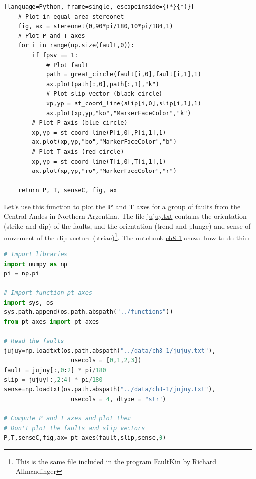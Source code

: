\documentclass[a4paper , 12pt]{book}
\begin{document}
\begin{center}
\begin{lstlisting}[language=Python, frame=single, escapeinside={(*}{*)}]
	# Plot in equal area stereonet
	fig, ax = stereonet(0,90*pi/180,10*pi/180,1)
	# Plot P and T axes
	for i in range(np.size(fault,0)):
		if fpsv == 1:
			# Plot fault
			path = great_circle(fault[i,0],fault[i,1],1)
			ax.plot(path[:,0],path[:,1],"k")
			# Plot slip vector (black circle)
			xp,yp = st_coord_line(slip[i,0],slip[i,1],1)
			ax.plot(xp,yp,"ko","MarkerFaceColor","k")
		# Plot P axis (blue circle)
		xp,yp = st_coord_line(P[i,0],P[i,1],1)
		ax.plot(xp,yp,"bo","MarkerFaceColor","b")
		# Plot T axis (red circle)
		xp,yp = st_coord_line(T[i,0],T[i,1],1)
		ax.plot(xp,yp,"ro","MarkerFaceColor","r")
	
	return P, T, senseC, fig, ax
\end{lstlisting}
\end{center}

Let's use this function to plot the \textbf{P} and \textbf{T} axes for a group of faults from the Central Andes in Northern Argentina. The file \href{https://github.com/nfcd/compGeo/blob/master/source/data/ch8-1/jujuy.txt}{jujuy.txt} contains the orientation (strike and dip) of the faults, and the orientation (trend and plunge) and sense of movement of the slip vectors (striae)\footnote{This is the same file included in the program \href{https://www.rickallmendinger.net/faultkin}{FaultKin} by Richard Allmendinger}. The notebook \href{https://github.com/nfcd/compGeo/blob/master/source/notebooks/ch8-1.ipynb}{ch8-1} shows how to do this:

\begin{center}
\begin{lstlisting}[language=Python, frame=single]
# Import libraries
import numpy as np
pi = np.pi

# Import function pt_axes
import sys, os
sys.path.append(os.path.abspath("../functions"))
from pt_axes import pt_axes

# Read the faults
jujuy=np.loadtxt(os.path.abspath("../data/ch8-1/jujuy.txt"), 
                   usecols = [0,1,2,3])
fault = jujuy[:,0:2] * pi/180
slip = jujuy[:,2:4] * pi/180
sense=np.loadtxt(os.path.abspath("../data/ch8-1/jujuy.txt"), 
                   usecols = 4, dtype = "str")

# Compute P and T axes and plot them
# Don't plot the faults and slip vectors
P,T,senseC,fig,ax= pt_axes(fault,slip,sense,0)
\end{lstlisting}
\end{center}
\end{document}
